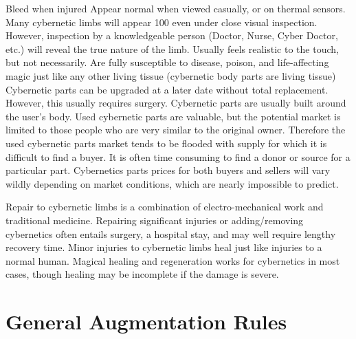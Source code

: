 \documentclass[twoside]{book}
\begin{document}
                Bleed when injured   
                  Appear normal when viewed casually, or on thermal
                 sensors. Many cybernetic limbs will appear 100%
                 even under close visual inspection. However, inspection
                 by a knowledgeable person (Doctor, Nurse, Cyber Doctor,
                 etc.) will reveal the true nature of the limb. 
                  Usually feels realistic to the touch, but not
                 necessarily. 
                  Are fully susceptible to disease, poison, and
                 life-affecting magic just like any other living tissue
                 (cybernetic body parts are living tissue) 
                  Cybernetic parts can be upgraded at a later date
                 without total replacement. However, this usually
                 requires surgery. 
                  Cybernetic parts are usually built around the
                 user’s body. Used cybernetic parts are valuable,
                 but the potential market is limited to those people who
                 are very similar to the original owner. Therefore the
                 used cybernetic parts market tends to be flooded with
                 supply for which it is difficult to find a buyer. It is
                 often time consuming to find a donor or source for a
                 particular part. Cybernetics parts prices for both
                 buyers and sellers will vary wildly depending on market
                 conditions, which are nearly impossible to predict.
                 
                  Repair to cybernetic limbs is a combination of
                 electro-mechanical work and traditional medicine.
                 Repairing significant injuries or adding/removing
                 cybernetics often entails surgery, a hospital stay, and
                 may well require lengthy recovery time. 
                  Minor injuries to cybernetic limbs heal just like
                 injuries to a normal human. Magical healing and
                 regeneration works for cybernetics in most cases, though
                 healing may be incomplete if the damage is severe.
                 
            
\section{General Augmentation Rules}
      
\end{document}
